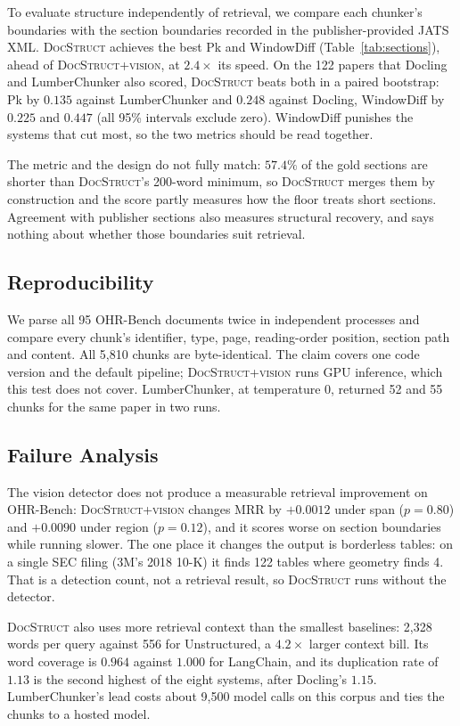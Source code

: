 \documentclass[11pt]{article}
\newcommand{\ds}{\textsc{DocStruct}}
\newcommand{\dsv}{\textsc{DocStruct}+\textsc{vision}}
\begin{document}
To evaluate structure independently of retrieval, we compare each chunker's boundaries with the section boundaries recorded in the publisher-provided JATS XML. \ds{} achieves the best Pk and WindowDiff (Table~\ref{tab:sections}), ahead of \dsv{}, at $2.4\times$ its speed. On the 122 papers that Docling and LumberChunker also scored, \ds{} beats both in a paired bootstrap: Pk by $0.135$ against LumberChunker and $0.248$ against Docling, WindowDiff by $0.225$ and $0.447$ (all 95\% intervals exclude zero). WindowDiff punishes the systems that cut most, so the two metrics should be read together.

The metric and the design do not fully match: $57.4\%$ of the gold sections are shorter than \ds{}'s 200-word minimum, so \ds{} merges them by construction and the score partly measures how the floor treats short sections. Agreement with publisher sections also measures structural recovery, and says nothing about whether those boundaries suit retrieval.

\subsection{Reproducibility}
\label{sec:determinism}

We parse all 95 OHR-Bench documents twice in independent processes and compare every chunk's identifier, type, page, reading-order position, section path and content. All 5{,}810 chunks are byte-identical. The claim covers one code version and the default pipeline; \dsv{} runs GPU inference, which this test does not cover. LumberChunker, at temperature 0, returned 52 and 55 chunks for the same paper in two runs.

\subsection{Failure Analysis}
\label{sec:cost}

The vision detector does not produce a measurable retrieval improvement on OHR-Bench: \dsv{} changes MRR by $+0.0012$ under span ($p=0.80$) and $+0.0090$ under region ($p=0.12$), and it scores worse on section boundaries while running slower. The one place it changes the output is borderless tables: on a single SEC filing (3M's 2018 10-K) it finds 122 tables where geometry finds 4. That is a detection count, not a retrieval result, so \ds{} runs without the detector.

\ds{} also uses more retrieval context than the smallest baselines: 2{,}328 words per query against 556 for Unstructured, a $4.2\times$ larger context bill. Its word coverage is $0.964$ against $1.000$ for LangChain, and its duplication rate of $1.13$ is the second highest of the eight systems, after Docling's $1.15$. LumberChunker's lead costs about 9{,}500 model calls on this corpus and ties the chunks to a hosted model.
\end{document}
